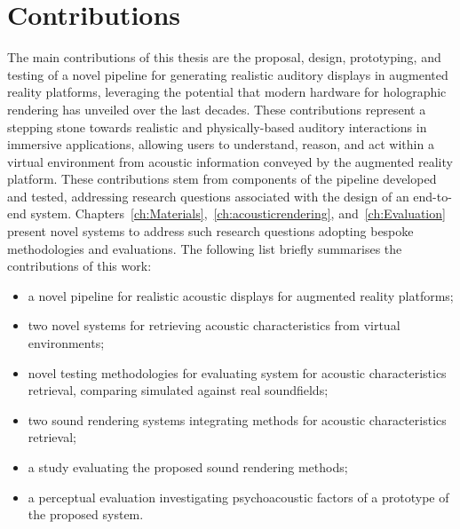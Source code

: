 \section{Contributions}
The main contributions of this thesis are the proposal, design, prototyping, and testing of a novel pipeline for generating realistic auditory displays in augmented reality platforms, leveraging the potential that modern hardware for holographic rendering has unveiled over the last decades. These contributions represent a stepping stone towards realistic and physically-based auditory interactions in immersive applications, allowing users to understand, reason, and act within a virtual environment from acoustic information conveyed by the augmented reality platform.
These contributions stem from components of the pipeline developed and tested, addressing research questions associated with the design of an end-to-end system. Chapters~\ref{ch:Materials},~\ref{ch:acousticrendering}, and~\ref{ch:Evaluation} present novel systems to address such research questions adopting bespoke methodologies and evaluations. The following list briefly summarises the contributions of this work:
\begin{itemize}
    \item a novel pipeline for realistic acoustic displays for augmented reality platforms;
    \item two novel systems for retrieving acoustic characteristics from virtual environments;
    \item novel testing methodologies for evaluating system for acoustic characteristics retrieval, comparing simulated against real soundfields;
    \item two sound rendering systems integrating methods for acoustic characteristics retrieval;
    \item a study evaluating the proposed sound rendering methods;
    \item a perceptual evaluation investigating psychoacoustic factors of a prototype of the proposed system.
\end{itemize}

